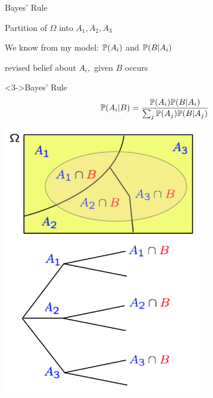 \documentclass[handout,fleqn,aspectratio=169]{beamer}
\begin{document}
\begin{frame}{Bayes' Rule}

{
\plitemsep 0.1in

\bci
\item Partition of $\Omega$ into $A_1,A_2,A_3$

\item We know from my model: $\mathbb{P}( A_i )$ and $\mathbb{P}( B | A_i )$ 

\item<2-> 

\item<2-> revised belief about $A_i,$ given $B$ occurs

\begin{block}<3->{Bayes' Rule}
$$
\mathbb{P}( A_i | B ) = \frac{\mathbb{P}( A_i ) \mathbb{P}( B | A_i )}{\sum_{j} \mathbb{P}( A_j ) \mathbb{P}( B | A_j )}
$$
\end{block}

\eci 
}
{
\centering
\includegraphics[width=0.65\textwidth]{L2_total_ex.png}
}

\end{frame}
\end{document}
